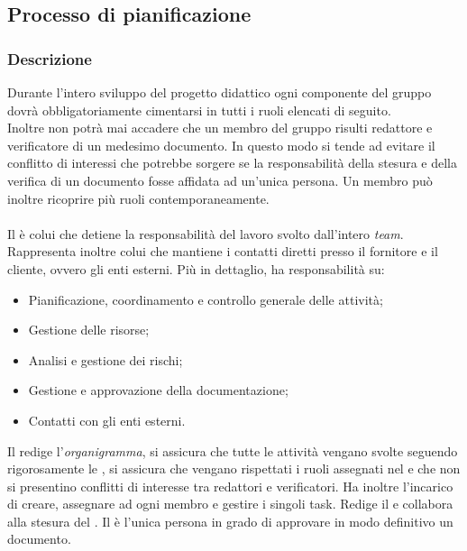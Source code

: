 \subsection{Processo di pianificazione}

\subsubsection{Descrizione}
Durante l'intero sviluppo del progetto didattico ogni componente del gruppo
dovrà obbligatoriamente cimentarsi in tutti i ruoli elencati di seguito. \\
Inoltre non potrà mai accadere che un membro del gruppo risulti redattore e verificatore di un medesimo documento.
In questo modo si tende ad evitare il conflitto di interessi che potrebbe sorgere se la responsabilità della stesura e della verifica di un documento fosse affidata ad un'unica persona.
Un membro può inoltre ricoprire più ruoli contemporaneamente.

\paragraph{\RdP}
Il \textit{\RdP} è colui che detiene la responsabilità del
lavoro svolto dall'intero \textit{team}. Rappresenta inoltre colui che mantiene i
contatti diretti presso il fornitore e il cliente, ovvero gli enti esterni. Più
in dettaglio, ha responsabilità su:
\begin{itemize}
  \item Pianificazione, coordinamento e controllo generale delle attività;
  \item Gestione delle risorse;
  \item Analisi e gestione dei rischi;
  \item Gestione e approvazione della documentazione;
  \item Contatti con gli enti esterni.
\end{itemize}
Il \textit{\RdP} redige l'\textit{organigramma}, si assicura che
tutte le attività vengano svolte seguendo rigorosamente le \textit{\NdP}, si
assicura che vengano rispettati i ruoli assegnati nel \textit{\PdP} e che non si
presentino conflitti di interesse tra redattori e verificatori. Ha inoltre
l'incarico di creare, assegnare ad ogni membro e gestire i singoli task. Redige
il \textit{\PdP} e collabora alla stesura del \textit{\PdQ}. Il \textit{\RdP} è
l'unica persona in grado di approvare in modo definitivo un documento.

